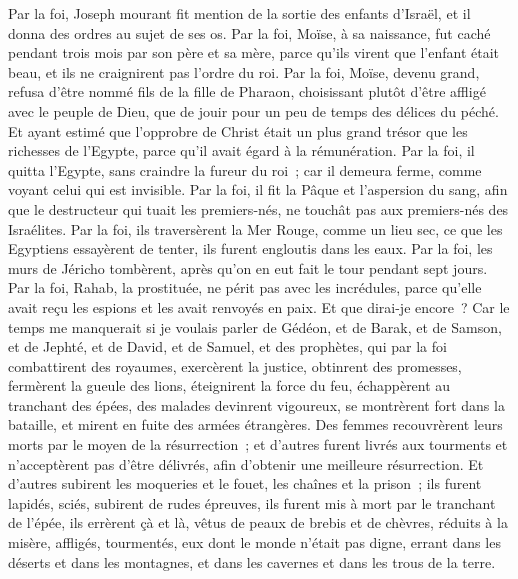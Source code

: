 \begin{multicols}{2}
Par la foi, Joseph mourant fit mention de la sortie des enfants d'Israël, et il donna des ordres au sujet de ses os.
Par la foi, Moïse, à sa naissance, fut caché pendant trois mois par son père et sa mère, parce qu'ils virent que l'enfant était beau, et ils ne craignirent pas l'ordre du roi.
Par la foi, Moïse, devenu grand, refusa d'être nommé fils de la fille de Pharaon,
choisissant plutôt d'être affligé avec le peuple de Dieu, que de jouir pour un peu de temps des délices du péché.
Et ayant estimé que l'opprobre de Christ était un plus grand trésor que les richesses de l'Egypte, parce qu'il avait égard à la rémunération.
Par la foi, il quitta l'Egypte, sans craindre la fureur du roi~; car il demeura ferme, comme voyant celui qui est invisible.
Par la foi, il fit la Pâque et l'aspersion du sang, afin que le destructeur qui tuait les premiers-nés, ne touchât pas aux premiers-nés des Israélites.
Par la foi, ils traversèrent la Mer Rouge, comme un lieu sec, ce que les Egyptiens essayèrent de tenter, ils furent engloutis dans les eaux.
Par la foi, les murs de Jéricho tombèrent, après qu'on en eut fait le tour pendant sept jours.
Par la foi, Rahab, la prostituée, ne périt pas avec les incrédules, parce qu'elle avait reçu les espions et les avait renvoyés en paix.
Et que dirai-je encore~? Car le temps me manquerait si je voulais parler de Gédéon, et de Barak, et de Samson, et de Jephté, et de David, et de Samuel, et des prophètes,
qui par la foi combattirent des royaumes, exercèrent la justice, obtinrent des promesses, fermèrent la gueule des lions,
éteignirent la force du feu, échappèrent au tranchant des épées, des malades devinrent vigoureux, se montrèrent fort dans la bataille, et mirent en fuite des armées étrangères.
Des femmes recouvrèrent leurs morts par le moyen de la résurrection~; et d'autres furent livrés aux tourments et n'acceptèrent pas d'être délivrés, afin d'obtenir une meilleure résurrection.
Et d'autres subirent les moqueries et le fouet, les chaînes et la prison~;
ils furent lapidés, sciés, subirent de rudes épreuves, ils furent mis à mort par le tranchant de l'épée, ils errèrent çà et là, vêtus de peaux de brebis et de chèvres, réduits à la misère, affligés, tourmentés,
eux dont le monde n'était pas digne, errant dans les déserts et dans les montagnes, et dans les cavernes et dans les trous de la terre.

\end{multicols}
